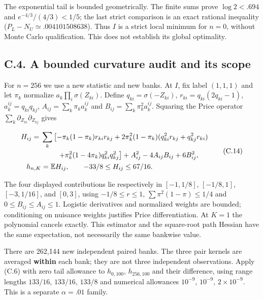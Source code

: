 \documentclass{article}
\begin{document}
The exponential tail is bounded geometrically. The finite sums prove
\(\log2<.694\) and \(e^{-4/3}/(4/3)<1/5\); the last strict comparison is
an exact rational inequality (\(P_L-N_U\simeq.004101508638\)). Thus
\(I\) is a strict local minimum for \(n=0\), without Monte Carlo
qualification. This does not establish its global optimality.

\subsection*{C.4. A bounded curvature audit and its
scope}\label{c.4.-a-bounded-curvature-audit-and-its-scope}

For \(n=256\) we use a new statistic and new banks. At \(I\), fix label
\((1,1,1)\) and let \(\pi_k\) normalize \(a_k\prod_i\sigma(Z_{ki})\).
Define \(q_{ki}=\sigma(-Z_{ki})\), \(r_{ki}=q_{ki}(2q_{ki}-1)\),
\(a_k^{ij}=q_{ki}q_{kj}\), \(A_{ij}=\sum_k\pi_ka_k^{ij}\) and
\(B_{ij}=\sum_k\pi_k^2a_k^{ij}\). Squaring the Price operator
\(\sum_k\partial_{Z_{ki}}\partial_{Z_{kj}}\) gives

\[
\begin{aligned}
H_{ij}={}&\sum_k\left[-\pi_k(1-\pi_k)r_{ki}r_{kj}
+2\pi_k^2(1-\pi_k)(q_{ki}^2r_{kj}+q_{kj}^2r_{ki})\right.\\
&\left.\hspace{8mm}+\pi_k^2(1-4\pi_k)q_{ki}^2q_{kj}^2\right]
+A_{ij}^2-4A_{ij}B_{ij}+6B_{ij}^2,\\
h_{n,K}&=\mathbb EH_{ij},\qquad -33/8\le H_{ij}\le67/16.
\end{aligned}
\tag{C.14}
\]

The four displayed contributions lie respectively in \([-1,1/8]\),
\([-1/8,1]\), \([-3,1/16]\), and \([0,3]\), using \(-1/8\le r\le1\),
\(\sum\pi^2(1-\pi)\le1/4\) and \(0\le B_{ij}\le A_{ij}\le1\). Logistic
derivatives and normalized weights are bounded; conditioning on nuisance
weights justifies Price differentiation. At \(K=1\) the polynomial
cancels exactly. This estimator and the square-root path Hessian have
the same expectation, not necessarily the same bankwise value.

There are 262,144 new independent paired banks. The three pair kernels
are averaged \textbf{within} each bank; they are not three independent
observations. Apply (C.6) with zero tail allowance to \(h_{0,100}\),
\(h_{256,100}\) and their difference, using range lengths \(133/16\),
\(133/16\), \(133/8\) and numerical allowances \(10^{-9}\), \(10^{-9}\),
\(2\times10^{-9}\). This is a separate \(\alpha=.01\) family.
\end{document}
